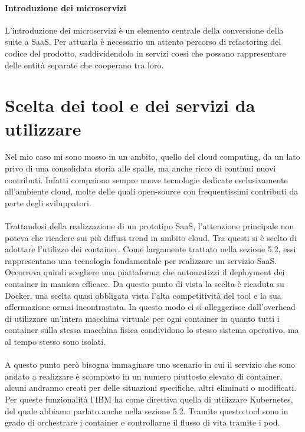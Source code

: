 \paragraph{Introduzione dei microservizi}
L'introduzione dei microservizi è un elemento centrale della conversione della suite a SaaS. Per attuarla è necessario un attento percorso di refactoring del codice del prodotto, suddividendolo in servizi coesi che possano rappresentare delle entità separate che cooperano tra loro.

\section{Scelta dei tool e dei servizi da utilizzare}
Nel mio caso mi sono mosso in un ambito, quello del cloud computing, da un lato privo di una consolidata storia alle spalle, ma anche ricco di continui nuovi contributi. Infatti compaiono sempre nuove tecnologie dedicate esclusivamente all'ambiente cloud, molte delle quali open-source con frequentissimi contributi da parte degli sviluppatori.

\paragraph{}
Trattandosi della realizzazione di un prototipo SaaS, l'attenzione principale non poteva che ricadere sui più diffusi trend in ambito cloud. Tra questi si è scelto di adottare l'utilizzo dei container. Come largamente trattato nella sezione 5.2, essi rappresentano una tecnologia fondamentale per realizzare un servizio SaaS. Occorreva quindi scegliere una piattaforma che automatizzi il deployment dei container in maniera efficace. Da questo punto di vista la scelta è ricaduta su Docker, una scelta quasi obbligata vista l'alta competitività del tool e la sua affermazione ormai incontrastata. In questo modo ci si alleggerisce dall'overhead di utilizzare un'intera macchina virtuale per ogni container in quanto tutti i container sulla stessa macchina fisica condividono lo stesso sistema operativo, ma al tempo stesso sono isolati. 

\paragraph{}
A questo punto però bisogna immaginare uno scenario in cui il servizio che sono andato a realizzare è scomposto in un numero piuttosto elevato di container, alcuni andranno creati per delle situazioni specifiche, altri eliminati o modificati. Per queste funzionalità l'IBM ha come direttiva quella di utilizzare Kubernetes, del quale abbiamo parlato anche nella sezione 5.2. Tramite questo tool sono in grado di orchestrare i container e controllarne il flusso di vita tramite i pod.

